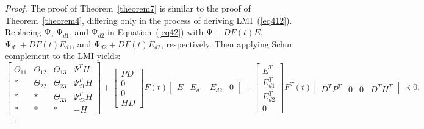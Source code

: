 \documentclass[a4paper]{cas-sc}
\newtheorem*{proof}{Proof}
\begin{document}
\begin{proof}
  The proof of Theorem~\ref{theorem7} is similar to the proof of Theorem~\ref{theorem4}, differing only in the process of deriving LMI~(\ref{eq412}). Replacing $\mathrm{\Psi}$, $\mathrm{\Psi}_{d1}$, and $\mathrm{\Psi}_{d2}$ in Equation~(\ref{eq42}) with $\mathrm{\Psi}+DF(t)E$, $\mathrm{\Psi}_{d1}+DF(t)E_{d1}$, and $\mathrm{\Psi}_{d2}+DF(t)E_{d2}$, respectively. Then applying Schur complement to the LMI yields:
  \begin{equation}
    \left[ {\begin{array}{*{20}{c}}
            {{\Theta _{11}}} & {{\Theta _{12}}} & {{\Theta _{13}}} & {{\Psi ^T}H}    \\
            *                & {{\Theta _{22}}} & {{\Theta _{23}}} & {\Psi _{d1}^TH} \\
            *                & *                & {{\Theta _{33}}} & {\Psi _{d2}^TH} \\
            *                & *                & *                & { - H}
          \end{array}} \right] + \left[ {\begin{array}{*{20}{c}}
            {PD} \\
            0    \\
            0    \\
            {HD}
          \end{array}} \right]F(t)\left[ {\begin{array}{*{20}{c}}
            E & {{E_{d1}}} & {{E_{d2}}} & 0
          \end{array}} \right] + \left[ {\begin{array}{*{20}{c}}
            {{E^T}}    \\
            {E_{d1}^T} \\
            {E_{d2}^T} \\
            0
          \end{array}} \right]{F^T}(t)\left[ {\begin{array}{*{20}{c}}
            {{D^T}{P^T}} & 0 & 0 & {{D^T}{H^T}}
          \end{array}} \right] \prec 0.
    \label{eq413}
  \end{equation}


\end{proof}
\end{document}
